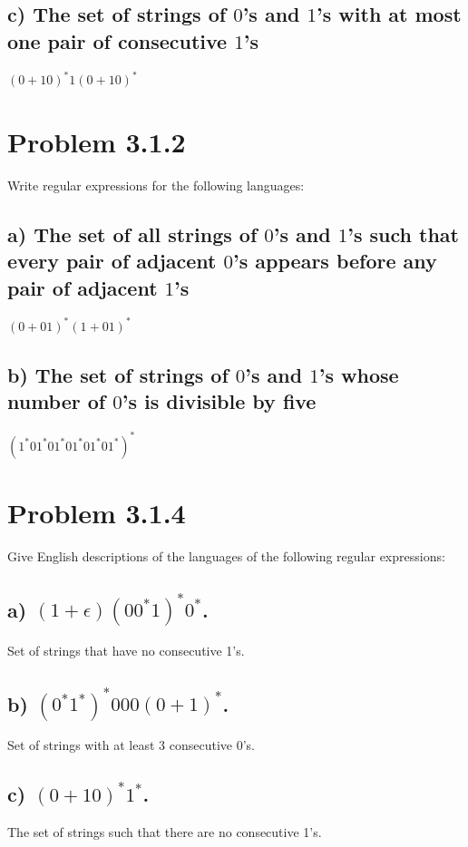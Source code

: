 \documentclass[20pt]{article} %
\begin{document}
\subsection{c) The set of strings of $0$'s and $1$'s with at most one pair of consecutive $1$'s}
$(0 + 10)^{*}1(0 + 10)^{*}$

\section{Problem 3.1.2}
Write regular expressions for the following languages:

\subsection{a) The set of all strings of $0$'s and $1$'s such that every pair of adjacent $0$'s appears before any pair of adjacent $1$'s}
$(0 + 01)^{*}(1 + 01)^{*}$

\subsection{b) The set of strings of $0$'s and $1$'s whose number of $0$'s is divisible by five}
$(1^{*}01^{*}01^{*}01^{*}01^{*}01^{*})^{*}$

\section{Problem 3.1.4}
Give English descriptions of the languages of the following regular expressions:

\subsection{a) $(1 + \epsilon)(00^{*}1)^{*}0^{*}$.}
Set of strings that have no consecutive 1's.

\subsection{b) $(0^{*}1^{*})^{*}000(0+1)^{*}$.}
Set of strings with at least 3 consecutive 0's.

\subsection{c) $(0+10)^{*}1^{*}$.}
The set of strings such that there are no consecutive 1's.
\end{document}
